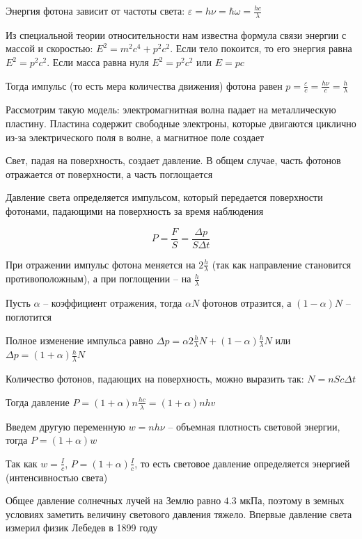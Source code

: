 \documentclass[12pt]{article}
\begin{document}
Энергия фотона зависит от частоты света: $\varepsilon = h \nu = \hbar \omega = \frac{h c}{\lambda}$

Из специальной теории относительности нам известна формула связи энергии с массой и скоростью: $E^2 = m^2 c^4 + p^2 c^2$. Если тело покоится, то его энергия равна $E^2 = p^2 c^2$. Если масса равна нуля $E^2 = p^2 c^2$ или $E = p c$

Тогда импульс (то есть мера количества движения) фотона равен $p = \frac{\varepsilon}{c} = \frac{h \nu}{c} = \frac{h}{\lambda}$

Рассмотрим такую модель: электромагнитная волна падает на металлическую пластину. Пластина содержит свободные электроны, которые двигаются циклично из-за электрического поля в волне, а магнитное поле создает 

Свет, падая на поверхность, создает давление. В общем случае, часть фотонов отражается от поверхности, а часть поглощается

Давление света определяется импульсом, который передается поверхности фотонами, падающими на поверхность за время наблюдения

\[P = \frac{F}{S} = \frac{\Delta p}{S \Delta t}\]

При отражении импульс фотона меняется на $2 \frac{h}{\lambda}$ (так как направление становится противоположным), а при поглощении -- на $\frac{h}{\lambda}$

Пусть $\alpha$ -- коэффициент отражения, тогда $\alpha N$ фотонов отразится, а $(1 - \alpha) N$ -- поглотится

Полное изменение импульса равно $\Delta p = \alpha 2\frac{h}{\lambda} N + (1 - \alpha) \frac{h}{\lambda} N$ или $\Delta p = (1 + \alpha) \frac{h}{\lambda} N$

Количество фотонов, падающих на поверхность, можно выразить так: $N = n S c \Delta t$

Тогда давление $P = (1 + \alpha) n \frac{h c}{\lambda} = (1 + \alpha) n h v$

Введем другую переменную $w = n h \nu$ -- объемная плотность световой энергии, тогда $P = (1 + \alpha) w$

Так как $w = \frac{I}{c}$, $P = (1 + \alpha) \frac{I}{c}$, то есть световое давление определяется энергией (интенсивностью света)

Общее давление солнечных лучей на Землю равно $4.3$ мкПа, поэтому в земных условиях заметить величину светового давления тяжело. Впервые давление света измерил физик Лебедев в 1899 году

\mediumvspace
\end{document}

